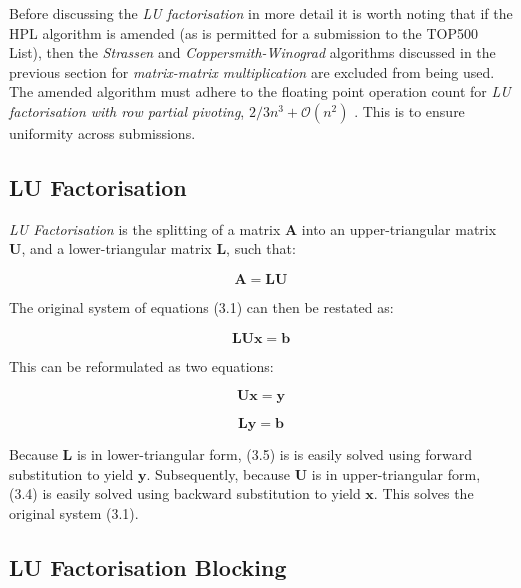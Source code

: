 Before discussing the \emph{LU factorisation} in more detail it is worth noting that if the HPL algorithm is amended (as is permitted for a submission to the TOP500 List), then the \emph{Strassen} and \emph{Coppersmith-Winograd} algorithms discussed in the previous section for \emph{matrix-matrix multiplication} are excluded from being used. The amended algorithm must adhere to the floating point operation count for \emph{LU factorisation with row partial pivoting}, $2/3n^3 + \mathcal{O}(n^2)$ \cite{linpack-ppf}. This is to ensure uniformity across submissions. 

%
%
\subsection{LU Factorisation}

\emph{LU Factorisation} is the splitting of a matrix $\mathbf{A}$ into an upper-triangular matrix $\mathbf{U}$, and a lower-triangular matrix $\mathbf{L}$, such that:

\begin{equation}
\mathbf{A}=\mathbf{L}\mathbf{U}
\end{equation}

The original system of equations (3.1) can then be restated as:

\begin{equation}
\mathbf{L}\mathbf{U}\mathbf{x}=\mathbf{b}
\end{equation}

This can be reformulated as two equations:

\begin{equation}
\mathbf{U}\mathbf{x}=\mathbf{y}
\end{equation}

\begin{equation}
\mathbf{L}\mathbf{y}=\mathbf{b}
\end{equation}

Because $\mathbf{L}$ is in lower-triangular form, (3.5) is is easily solved using forward substitution to yield $\mathbf{y}$. Subsequently, because $\mathbf{U}$ is in upper-triangular form, (3.4) is easily solved using backward substitution to yield $\mathbf{x}$. This solves the original system (3.1).


%
%
\subsection{LU Factorisation Blocking}



